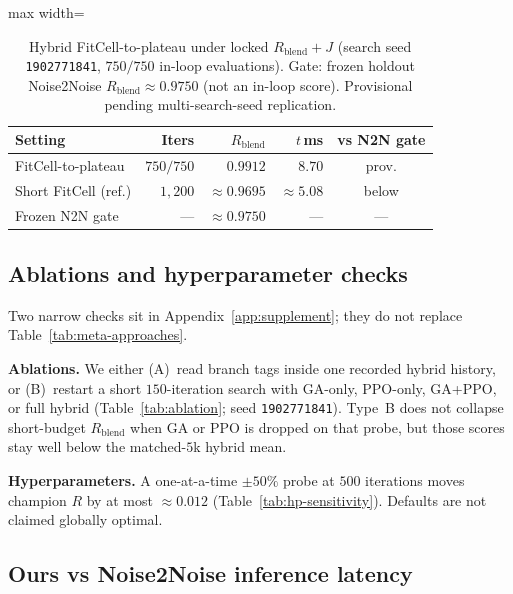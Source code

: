 \begin{table}[t]
  \centering
  \caption{Hybrid FitCell-to-plateau under locked $R_{\mathrm{blend}}{+}J$
  (search seed \texttt{1902771841}, $750/750$ in-loop evaluations).
  Gate: frozen holdout Noise2Noise $R_{\mathrm{blend}}{\approx}0.9750$ (not an in-loop score).
  Provisional pending multi-search-seed replication.}
  \label{tab:v14-hybrid-converge}
  \setlength{\tabcolsep}{3pt}
  \footnotesize
  \begin{adjustbox}{max width=\columnwidth}
  \begin{tabular}{@{}lrrrc@{}}
    \toprule
    Setting & Iters & $R_{\mathrm{blend}}$ & $t$\,ms & vs N2N gate \\
    \midrule
    FitCell-to-plateau & $750/750$ & $0.9912$ & $8.70$ & prov.\\
    Short FitCell (ref.) & $1{,}200$ & ${\approx}0.9695$ & ${\approx}5.08$ & below \\
    Frozen N2N gate & --- & ${\approx}0.9750$ & --- & --- \\
    \bottomrule
  \end{tabular}
  \end{adjustbox}
\end{table}

\subsection{Ablations and hyperparameter checks}
\label{sec:ablation-def}
\label{sec:ablation-hp-main}

Two narrow checks sit in Appendix~\ref{app:supplement}; they do not replace Table~\ref{tab:meta-approaches}.

\textbf{Ablations.}
We either (A)~read branch tags inside one recorded hybrid history, or
(B)~restart a short $150$-iteration search with GA-only, PPO-only, GA+PPO, or full hybrid
(Table~\ref{tab:ablation}; seed \texttt{1902771841}).
Type~B does not collapse short-budget $R_{\mathrm{blend}}$ when GA or PPO is dropped on that probe,
but those scores stay well below the matched-$5$k hybrid mean.

\textbf{Hyperparameters.}
A one-at-a-time $\pm 50\%$ probe at $500$ iterations moves champion $R$ by at most ${\approx}0.012$
(Table~\ref{tab:hp-sensitivity}).
Defaults are not claimed globally optimal.

\subsection{Ours vs Noise2Noise inference latency}
\label{sec:ours-n2n-latency}

